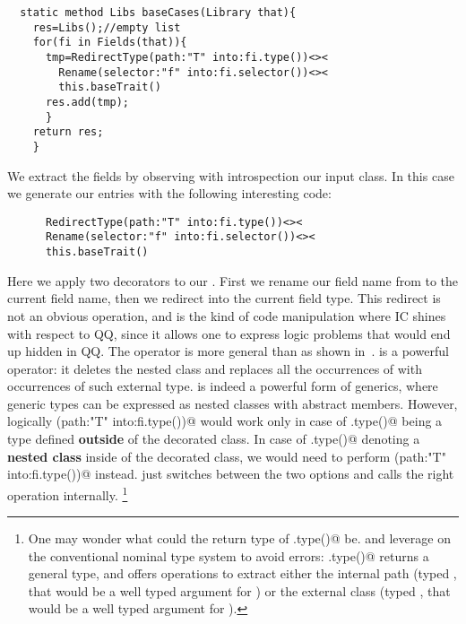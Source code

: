 \begin{lstlisting}
  static method Libs baseCases(Library that){
    res=Libs();//empty list
    for(fi in Fields(that)){
      tmp=RedirectType(path:"T" into:fi.type())<><
        Rename(selector:"f" into:fi.selector())<><
        this.baseTrait()
      res.add(tmp);
      }
    return res;
    }
\end{lstlisting}

\noindent
We extract the fields by observing with introspection
our input class.
In this case we generate our entries with the following interesting code:

\begin{lstlisting}
      RedirectType(path:"T" into:fi.type())<><
      Rename(selector:"f" into:fi.selector())<><
      this.baseTrait()
\end{lstlisting}

Here we apply two decorators to our \Q@baseTrait@. First
we rename our field name from \Q@f@ to the current field name, then
 we redirect \Q@T@ into the current field type.
 This redirect is not an obvious operation, and is the kind of code manipulation where IC shines
with respect to QQ, since it allows one to express logic problems that would end up hidden in QQ.
 The operator \Q@RedirectType@ is more general than \Q@Redirect@ as shown in~\cite{servetto2014meta}.
 \Q@Redirect@ is a powerful operator:
 it deletes the nested class \Q@T@ and replaces all
 the occurrences of \Q@T@ with occurrences of such external type.
 \Q@Redirect@ is indeed a powerful form of generics,
 where generic types can be expressed as nested classes with abstract members.
 However, logically \Q@Redirect(path:"T" into:fi.type())@
 would work only in case of \Q@fi.type()@ being a type
 defined \textbf{outside} of the decorated class.
 In case of \Q@fi.type()@ denoting a \textbf{nested class} inside of the decorated class,
 we would need to perform \Q@Rename(path:"T" into:fi.type())@ instead.
 \Q@RedirectType@ just switches between the two options and calls the right operation internally.%
\footnote{
One may wonder what could the return type of \Q@fi.type()@
be. \Q@Rename@ and \Q@Redirect@ leverage on the
conventional nominal type system to avoid errors:
 \Q@fi.type()@ returns a general \Q@Type@ type, and offers operations to extract either
 the internal path (typed \Q@Path@, that would be a well typed argument for \Q@Rename@)
 or the external class (typed \Q@Class@, that would be a well typed argument for \Q@Redirect@).}

